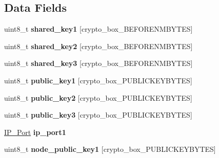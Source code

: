 \subsection*{Data Fields}
\begin{DoxyCompactItemize}
\item 
\hypertarget{struct_onion___path_ac38c2cdd308cce10c53e276cb664c644}{uint8\+\_\+t {\bfseries shared\+\_\+key1} \mbox{[}crypto\+\_\+box\+\_\+\+B\+E\+F\+O\+R\+E\+N\+M\+B\+Y\+T\+E\+S\mbox{]}}\label{struct_onion___path_ac38c2cdd308cce10c53e276cb664c644}

\item 
\hypertarget{struct_onion___path_a677ff69e40fecc070cfe5ebe1f4ecb71}{uint8\+\_\+t {\bfseries shared\+\_\+key2} \mbox{[}crypto\+\_\+box\+\_\+\+B\+E\+F\+O\+R\+E\+N\+M\+B\+Y\+T\+E\+S\mbox{]}}\label{struct_onion___path_a677ff69e40fecc070cfe5ebe1f4ecb71}

\item 
\hypertarget{struct_onion___path_ab9b6dd504522fbbb77500ab7e5d27121}{uint8\+\_\+t {\bfseries shared\+\_\+key3} \mbox{[}crypto\+\_\+box\+\_\+\+B\+E\+F\+O\+R\+E\+N\+M\+B\+Y\+T\+E\+S\mbox{]}}\label{struct_onion___path_ab9b6dd504522fbbb77500ab7e5d27121}

\item 
\hypertarget{struct_onion___path_a203561e286f807c2f057fc6bce17e2d8}{uint8\+\_\+t {\bfseries public\+\_\+key1} \mbox{[}crypto\+\_\+box\+\_\+\+P\+U\+B\+L\+I\+C\+K\+E\+Y\+B\+Y\+T\+E\+S\mbox{]}}\label{struct_onion___path_a203561e286f807c2f057fc6bce17e2d8}

\item 
\hypertarget{struct_onion___path_adb351a6df6a87dbb748077bd8081270d}{uint8\+\_\+t {\bfseries public\+\_\+key2} \mbox{[}crypto\+\_\+box\+\_\+\+P\+U\+B\+L\+I\+C\+K\+E\+Y\+B\+Y\+T\+E\+S\mbox{]}}\label{struct_onion___path_adb351a6df6a87dbb748077bd8081270d}

\item 
\hypertarget{struct_onion___path_a0fa442ed05e4279ea8bcb1d039724f2b}{uint8\+\_\+t {\bfseries public\+\_\+key3} \mbox{[}crypto\+\_\+box\+\_\+\+P\+U\+B\+L\+I\+C\+K\+E\+Y\+B\+Y\+T\+E\+S\mbox{]}}\label{struct_onion___path_a0fa442ed05e4279ea8bcb1d039724f2b}

\item 
\hypertarget{struct_onion___path_ad7670c0a1a9d05b2a807a9c1a7950b79}{\hyperlink{struct_i_p___port}{I\+P\+\_\+\+Port} {\bfseries ip\+\_\+port1}}\label{struct_onion___path_ad7670c0a1a9d05b2a807a9c1a7950b79}

\item 
\hypertarget{struct_onion___path_a38f4e3f7780648cf74f808d7942113d8}{uint8\+\_\+t {\bfseries node\+\_\+public\+\_\+key1} \mbox{[}crypto\+\_\+box\+\_\+\+P\+U\+B\+L\+I\+C\+K\+E\+Y\+B\+Y\+T\+E\+S\mbox{]}}\label{struct_onion___path_a38f4e3f7780648cf74f808d7942113d8}


\end{DoxyCompactItemize}
